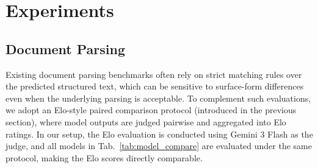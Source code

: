 \documentclass{article}
\begin{document}
\section{Experiments}
\label{sec:experiments}

\subsection{Document Parsing}
Existing document parsing benchmarks often rely on strict matching rules over the predicted structured text, which can be sensitive to surface-form differences even when the underlying parsing is acceptable. To complement such evaluations, we adopt an Elo-style paired comparison protocol (introduced in the previous section), where model outputs are judged pairwise and aggregated into Elo ratings.
In our setup, the Elo evaluation is conducted using Gemini 3 Flash as the judge, and all models in Tab.~\ref{tab:model_compare} are evaluated under the same protocol, making the Elo scores directly comparable.

\begin{table}[h]
\centering
\caption{Elo comparison on olmOCR-Bench~\cite{poznanski2025olmocr}, OmniDocBench(v1.5)~\cite{ouyang2025omnidocbench}, and XDocParse~\cite{li2025dots}. All models are evaluated under the same Elo protocol with Gemini 3 Flash as judge, on benchmark-provided document images.}
\label{tab:model_compare}
\end{table}
\end{document}
